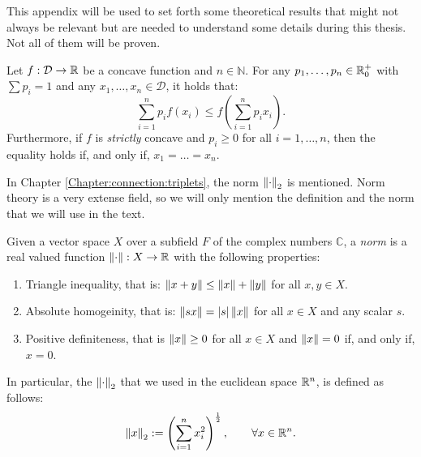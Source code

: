 \label{APPENDIX:A}

This appendix will be used to set forth some theoretical results that might not always be relevant but are needed to understand some details during this thesis. Not all of them will be proven.

\begin{nprop}\label{prop:jensen}
    Let $f:\mathcal D \to \mathbb{R}$ be a concave function and $n\in \mathbb N$. For any $p_1,\dots,p_n \in \mathbb{R}^+_0$ with $\sum p_i = 1$ and any $x_1,\dots,x_n \in \mathcal D$, it holds that:
    $$
    \sum_{i = 1}^n p_i f(x_i) \leq f \left(\sum_{i=1}^n p_i x_i\right).
    $$
    Furthermore, if $f$ is \emph{strictly} concave and $p_i \geq 0$ for all $i  = 1,\dots,n$, then the equality holds if, and only if, $x_1 = \dots = x_n$.
\end{nprop}

In Chapter \ref{Chapter:connection:triplets}, the norm $\left\lVert\cdot\right\rVert_2$ is mentioned. Norm theory is a very extense field, so we will only mention the definition and the norm that we will use in the text.

\begin{ndefC}\label{def:norm}
Given a vector space $X$ over a subfield $F$ of the complex numbers $\mathbb C$, a \emph{norm} is a real valued function $\left\lVert\cdot\right\rVert:X \to \mathbb{R}$ with the following properties:
\begin{enumerate}
\item Triangle inequality, that is: $\left\lVert x+y\right\rVert \leq \left\lVert x\right\rVert + \left\lVert y\right\rVert$ for all $x,y \in X$.
\item Absolute homogeinity, that is: $\left\lVert sx\right\rVert = \left\lvert s\right\rvert\left\lVert x\right\rVert$ for all $x\in X$ and any scalar $s$.
\item Positive definiteness, that is $\left\lVert x\right\rVert \geq 0 $ for all $x \in X$ and $\left\lVert x\right\rVert = 0$ if, and only if, $x = 0$.
\end{enumerate}
\end{ndefC}
In particular, the $\left\lVert\cdot\right\rVert_2$ that we used in the euclidean space $\mathbb{R}^n$, is defined as follows:
\[
\left\lVert x\right\rVert_2 := \left(\sum_{i = 1}^n x_i^2\right)^{\frac{1}{2}}, \quad \quad \forall x \in \mathbb{R}^n.     
\]